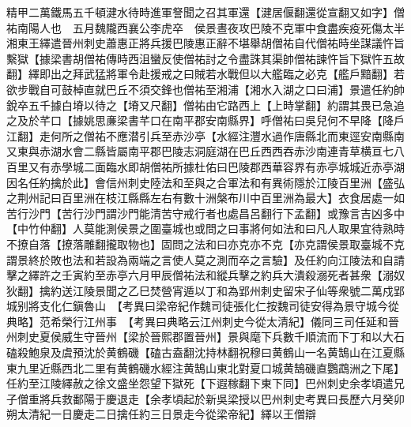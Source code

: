 精甲二萬鐵馬五千頓湕水待時進軍詧聞之召其軍還【湕居偃翻還從宣翻又如字】僧祐南陽人也　五月魏隴西襄公李虎卒　侯景晝夜攻巴陵不克軍中食盡疾疫死傷太半湘東王繹遣晉州刺史蕭惠正將兵援巴陵惠正辭不堪舉胡僧祐自代僧祐時坐謀議忤旨繫獄【據梁書胡僧祐傳時西沮蠻反使僧祐討之令盡誅其渠帥僧祐諫忤旨下獄忤五故翻】繹即出之拜武猛將軍令赴援戒之曰賊若水戰但以大艦臨之必克【艦戶黯翻】若欲步戰自可鼓棹直就巴丘不須交鋒也僧祐至湘浦【湘水入湖之口曰浦】景遣任約帥銳卒五千據白塉以待之【塉又尺翻】僧祐由它路西上【上時掌翻】約謂其畏已急追之及於芊口【據姚思亷梁書芊口在南平郡安南縣界】呼僧祐曰吳兒何不早降【降戶江翻】走何所之僧祐不應潜引兵至赤沙亭【水經注灃水過作唐縣北而東逕安南縣南又東與赤湖水會二縣皆屬南平郡巴陵志洞庭湖在巴丘西西吞赤沙南連青草横亘七八百里又有赤學城二面臨水即胡僧祐所據杜佑曰巴陵郡西華容界有赤亭城城近赤亭湖因名任約擒於此】會信州刺史陸法和至與之合軍法和有異術隱於江陵百里洲【盛弘之荆州記曰百里洲在枝江縣縣左右有數十洲槃布川中百里洲為最大】衣食居處一如苦行沙門【苦行沙門謂沙門能清苦守戒行者也處昌呂翻行下孟翻】或豫言吉凶多中【中竹仲翻】人莫能測侯景之圍臺城也或問之曰事將何如法和曰凡人取果宜待熟時不撩自落【撩落雕翻攏取物也】固問之法和曰亦克亦不克【亦克謂侯景取臺城不克謂景終於敗也法和若設為兩端之言使人莫之測而卒之言驗】及任約向江陵法和自請擊之繹許之壬寅約至赤亭六月甲辰僧祐法和縱兵擊之約兵大潰殺溺死者甚衆【溺奴狄翻】擒約送江陵景聞之乙巳焚營宵遁以丁和為郢州刺史留宋子仙等衆號二萬戍郢城别將支化仁鎭魯山　【考異曰梁帝紀作魏司徒張化仁按魏司徒安得為景守城今從典略】范希榮行江州事　【考異曰典略云江州刺史今從太清紀】儀同三司任延和晉州刺史夏侯威生守晉州【梁於晉熙郡置晉州】景與麾下兵數千順流而下丁和以大石磕殺鮑泉及虞預沈於黄鶴磯【磕古盍翻沈持林翻祝穆曰黄鶴山一名黄鵠山在江夏縣東九里近縣西北二里有黄鶴磯水經注黄鵠山東北對夏口城黄鵠磯直鸚鵡洲之下尾】任約至江陵繹赦之徐文盛坐怨望下獄死【下遐稼翻下東下同】巴州刺史余孝頃遣兄子僧重將兵救鄱陽于慶退走【余孝頃起於新吳梁授以巴州刺史考異曰長歷六月癸卯朔太清紀一日慶走二日擒任約三日景走今從梁帝紀】繹以王僧辯

